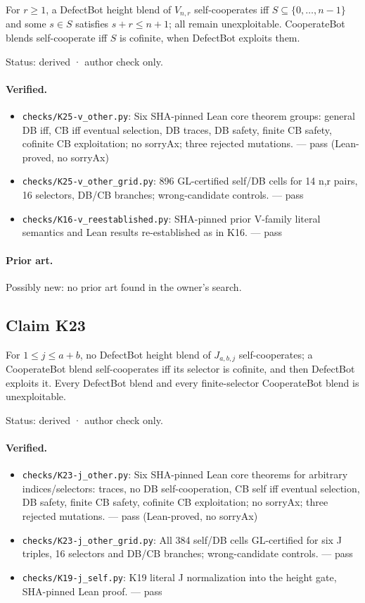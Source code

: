 \documentclass{article}
\begin{document}
For $r\ge1$, a DefectBot height blend of $V_{n,r}$ self-cooperates iff $S\subseteq\{0,\ldots,n-1\}$ and some $s\in S$ satisfies $s+r\le n+1$; all remain unexploitable. CooperateBot blends self-cooperate iff $S$ is cofinite, when DefectBot exploits them.

Status: derived · author check only.

\paragraph{Verified.}
\begin{itemize}
\item \texttt{checks/K25-v\_other.py}: Six SHA-pinned Lean core theorem groups: general DB iff, CB iff eventual selection, DB traces, DB safety, finite CB safety, cofinite CB exploitation; no sorryAx; three rejected mutations. --- pass (Lean-proved, no sorryAx)
\item \texttt{checks/K25-v\_other\_grid.py}: 896 GL-certified self/DB cells for 14 n,r pairs, 16 selectors, DB/CB branches; wrong-candidate controls. --- pass
\item \texttt{checks/K16-v\_reestablished.py}: SHA-pinned prior V-family literal semantics and Lean results re-established as in K16. --- pass
\end{itemize}

\paragraph{Prior art.} Possibly new: no prior art found in the owner's search.

\subsection*{Claim K23}

For $1\le j\le a+b$, no DefectBot height blend of $J_{a,b,j}$ self-cooperates; a CooperateBot blend self-cooperates iff its selector is cofinite, and then DefectBot exploits it. Every DefectBot blend and every finite-selector CooperateBot blend is unexploitable.

Status: derived · author check only.

\paragraph{Verified.}
\begin{itemize}
\item \texttt{checks/K23-j\_other.py}: Six SHA-pinned Lean core theorems for arbitrary indices/selectors: traces, no DB self-cooperation, CB self iff eventual selection, DB safety, finite CB safety, cofinite CB exploitation; no sorryAx; three rejected mutations. --- pass (Lean-proved, no sorryAx)
\item \texttt{checks/K23-j\_other\_grid.py}: All 384 self/DB cells GL-certified for six J triples, 16 selectors and DB/CB branches; wrong-candidate controls. --- pass
\item \texttt{checks/K19-j\_self.py}: K19 literal J normalization into the height gate, SHA-pinned Lean proof. --- pass
\end{itemize}
\end{document}
